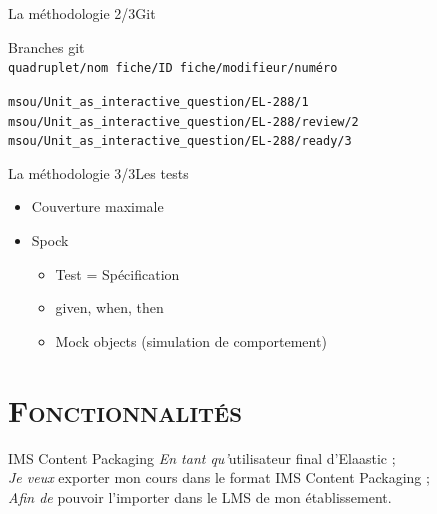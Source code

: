 \documentclass[xcolor=x11names,compress]{beamer}
\renewcommand{\(}{\begin{columns}}
\renewcommand{\)}{\end{columns}}
\newcommand{\<}[1]{\begin{column}{#1}}
\renewcommand{\>}{\end{column}}
\begin{document}
\begin{frame}{La méthodologie 2/3}{Git}
  \begin{center}
	Branches git\\
	{\small \tt quadruplet/nom fiche/ID fiche/modifieur/numéro}\\
	\vfill
  \end{center}
  \pause
  \begin{flushleft}
	{\small \tt msou/Unit\_as\_interactive\_question/EL-288/1}\\
	{\small \tt msou/Unit\_as\_interactive\_question/EL-288/review/2}\\
	{\small \tt msou/Unit\_as\_interactive\_question/EL-288/ready/3}
  \end{flushleft}
\end{frame}

\begin{frame}{La méthodologie 3/3}{Les tests}
  \begin{center}
	\begin{itemize}
	  \item Couverture maximale
	  \item Spock
	  \begin{itemize}
		  \item Test = Spécification
		  \item given, when, then
		  \item Mock objects (simulation de comportement)
	  \end{itemize}
	\end{itemize}
  \end{center}
\end{frame}


\section{\scshape Fonctionnalités}
\begin{frame}{IMS Content Packaging}{}
  {\em En tant qu'}utilisateur final d'Elaastic ;\\
  {\em Je veux} exporter mon cours dans le format IMS Content Packaging ;\\
  {\em Afin de} pouvoir l'importer dans le LMS de mon établissement.
\end{frame}
\end{document}
